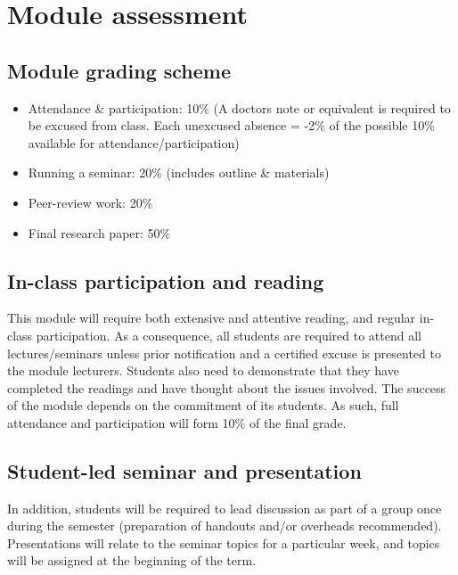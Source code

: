 
\section*{Module assessment}

\subsection*{Module grading scheme}

\begin{itemize}
	\item Attendance \& participation: 10\% (A doctors note or equivalent is required to be excused from class. Each unexcused absence = -2\% of the possible 10\% available for attendance/participation) 
	\item Running a seminar: 20\% (includes outline \& materials) 
	\item Peer-review work: 20\%
	\item Final research paper: 50\%
\end{itemize}

\subsection*{In-class participation and reading}

	This module will require both extensive and attentive reading, and regular in-class participation. As a consequence, all students are required to attend all lectures/seminars unless prior notification and a certified excuse is presented to the module lecturers. Students also need to demonstrate that they have completed the readings and have thought about the issues involved. The success of the module depends on the commitment of its students. As such, full attendance and participation will form 10\% of the final grade.

\subsection*{Student-led seminar and presentation}

	In addition, students will be required to lead discussion as part of a group once during the semester (preparation of handouts and/or overheads recommended). Presentations will relate to the seminar topics for a particular week, and topics will be assigned at the beginning of the term. %

